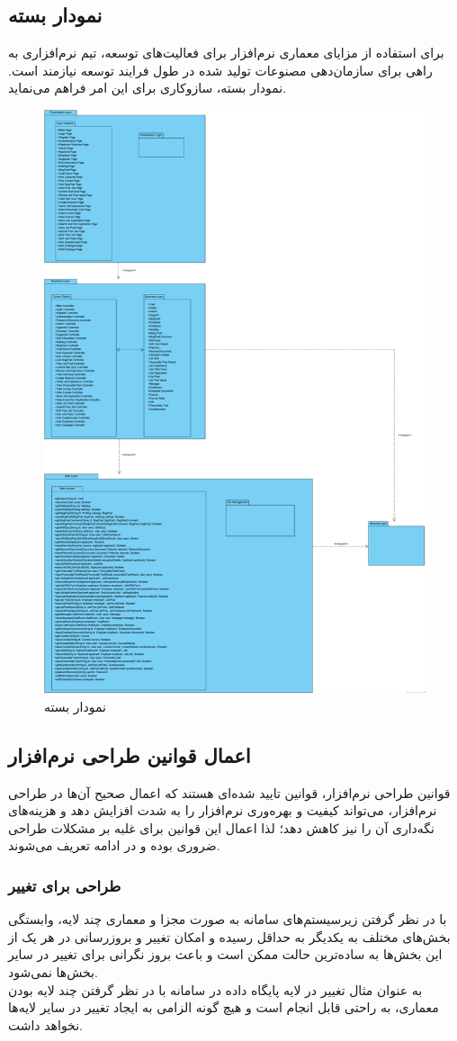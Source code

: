 \documentclass[12pt]{article}
\begin{document}
	\subsection{نمودار بسته}
	برای استفاده از مزایای معماری نرم‌افزار برای فعالیت‌های توسعه، تیم نرم‌افزاری به راهی برای سازمان‌دهی مصنوعات تولید شده در طول فرایند توسعه نیازمند است. نمودار بسته، سازوکاری برای این امر فراهم می‌نماید.
	\begin{figure}[H]
		\centering
		\includegraphics[width=0.5\linewidth]{files/Project_OOAD_Phase2_PackageDiagram}
		\caption{نمودار بسته}
		\label{fig:packagediagram}
	\end{figure}

	\subsection{اعمال قوانین طراحی نرم‌افزار}
	قوانین طراحی نرم‌افزار، قوانین تایید شده‌ای هستند که اعمال صحیح آن‌ها در طراحی نرم‌افزار، می‌تواند کیفیت و بهره‌وری نرم‌افزار را به شدت افزایش دهد و هزینه‌های نگه‌داری آن را نیز کاهش دهد؛ لذا اعمال این قوانین برای غلبه بر مشکلات طراحی ضروری بوده و در ادامه تعریف می‌شوند.
	\subsubsection{طراحی برای تغییر}
	با در نظر گرفتن زیرسیستم‌های سامانه به صورت مجزا و معماری چند لایه، وابستگی بخش‌های مختلف به یکدیگر به حداقل رسیده و امکان تغییر و بروزرسانی در هر یک از این بخش‌ها به ساده‌ترین حالت ممكن است و باعث بروز نگرانی برای تغییر در سایر بخش‌ها نمی‌شود.\\
	به عنوان مثال تغییر در لایه پایگاه داده در سامانه با در نظر گرفتن چند لایه بودن معماری، به راحتی قابل انجام است و هیچ گونه الزامی به ایجاد تغییر در سایر لایه‌ها نخواهد داشت.
\end{document}
